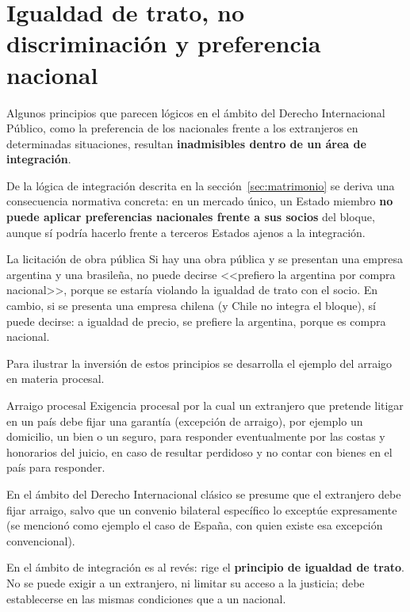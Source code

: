 \documentclass[12pt,oneside]{book}
\begin{document}
\section{Igualdad de trato, no discriminación y preferencia nacional}

Algunos principios que parecen lógicos en el ámbito del Derecho Internacional Público, como la preferencia de los nacionales frente a los extranjeros en determinadas situaciones, resultan \textbf{inadmisibles dentro de un área de integración}.

De la lógica de integración descrita en la sección~\ref{sec:matrimonio} se deriva una consecuencia normativa concreta: en un mercado único, un Estado miembro \textbf{no puede aplicar preferencias nacionales frente a sus socios} del bloque, aunque sí podría hacerlo frente a terceros Estados ajenos a la integración.

\begin{example}{La licitación de obra pública}
Si hay una obra pública y se presentan una empresa argentina y una brasileña, no puede decirse <<prefiero la argentina por compra nacional>>, porque se estaría violando la igualdad de trato con el socio. En cambio, si se presenta una empresa chilena (y Chile no integra el bloque), sí puede decirse: a igualdad de precio, se prefiere la argentina, porque es compra nacional.
\end{example}

Para ilustrar la inversión de estos principios se desarrolla el ejemplo del arraigo en materia procesal.

\begin{definition}{Arraigo procesal}
Exigencia procesal por la cual un extranjero que pretende litigar en un país debe fijar una garantía (excepción de arraigo), por ejemplo un domicilio, un bien o un seguro, para responder eventualmente por las costas y honorarios del juicio, en caso de resultar perdidoso y no contar con bienes en el país para responder.
\end{definition}

En el ámbito del Derecho Internacional clásico se presume que el extranjero debe fijar arraigo, salvo que un convenio bilateral específico lo exceptúe expresamente (se mencionó como ejemplo el caso de España, con quien existe esa excepción convencional).

\begin{important}
En el ámbito de integración es al revés: rige el \textbf{principio de igualdad de trato}. No se puede exigir a un extranjero, ni limitar su acceso a la justicia; debe establecerse en las mismas condiciones que a un nacional.
\end{important}
\end{document}

